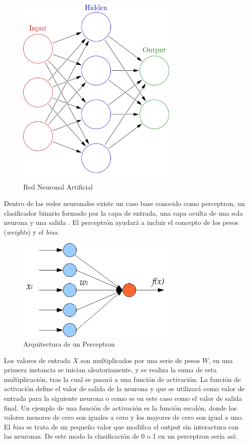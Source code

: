 \begin{figure}[H]
	\centering
	\includegraphics[width=8cm]{figs/Colored_neural_network.png}
	\caption{Red Neuronal Artificial}
	\label{fig:ANN}
\end{figure}

Dentro de las redes neuronales existe un caso base conocido como perceptron, un clasificador binario formado por la capa de entrada, una capa oculta de una sola neurona y una salida \cite{rosenblatt1958perceptron}. El perceptrón ayudará a incluir el concepto de los pesos (\textit{weights}) y el \textit{bias}. 

\begin{figure}[H]
	\centering
	\includegraphics[width=8cm]{figs/Single_layer_perceptron.png}
	\caption{Arquitectura de un Perceptron}
	\label{fig:perceptron}
\end{figure}

Los valores de entrada \(X\) son multiplicados por una serie de pesos \(W\), en una primera instancia se inician aleatoriamente, y se realiza la suma de esta multiplicación, tras la cual se pasará a una función de activación. La función de activación define el valor de salida de la neurona y que se utilizará como valor de entrada para la siguiente neurona o como es en este caso como el valor de salida final. Un ejemplo de una función de activación es la función escalón, donde los valores menores de cero son iguales a cero y los mayores de cero son igual a uno. El \textit{bias} se trata de un pequeño valor que modifica el output sin interactura con las neuronas. De este modo la clasificación de 0 o 1 en un perceptron sería así:


